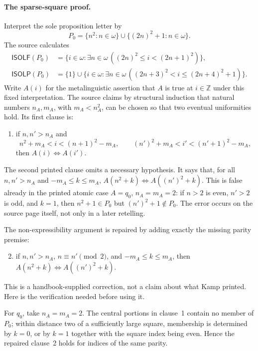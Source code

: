 \paragraph{The sparse-square proof.}
Interpret the sole proposition letter by
\[
 P_0
 =
 \{n^2:n\in\omega\}
 \cup
 \{(2n)^2+1:n\in\omega\}.
\]
The source calculates
\[
\begin{aligned}
 \mathsf{ISOLF}(P_0)
 &=
 \{i\in\omega:
   \exists n\in\omega\,((2n)^2\le i<(2n+1)^2)\},\\
 \mathsf{ISOLP}(P_0)
 &=
 \{1\}\cup
 \{i\in\omega:
   \exists n\in\omega\,((2n+3)^2<i\le(2n+4)^2+1)\}.
\end{aligned}
\]
Write \(A(i)\) for the metalinguistic assertion that \(A\) is true at
\(i\in\mathbb Z\) under this fixed interpretation.  The source claims by
structural induction that natural numbers \(n_A,m_A\), with
\(m_A<n_A^2\), can be chosen so that two eventual uniformities hold.  Its
first clause is:

\begin{enumerate}
\item if \(n,n'>n_A\) and
      \[
       n^2+m_A<i<(n+1)^2-m_A,
       \qquad
       (n')^2+m_A<i'<(n'+1)^2-m_A,
      \]
      then \(A(i)\Longleftrightarrow A(i')\).
\end{enumerate}

The second printed clause omits a necessary hypothesis.  It says that, for
all \(n,n'>n_A\) and \(-m_A\le k\le m_A\),
\(A(n^2+k)\Longleftrightarrow A((n')^2+k)\).  This is false already in the
printed atomic case \(A=q_0\), \(n_A=m_A=2\): if \(n>2\) is even,
\(n'>2\) is odd, and \(k=1\), then \(n^2+1\in P_0\) but
\((n')^2+1\notin P_0\).  The error occurs on the source page itself, not only
in a later retelling.

The non-expressibility argument is repaired by adding exactly the missing
parity premise:
\begin{enumerate}
\setcounter{enumi}{1}
\item if \(n,n'>n_A\), \(n\equiv n'\pmod 2\), and
      \(-m_A\le k\le m_A\), then
      \(A(n^2+k)\Longleftrightarrow A((n')^2+k)\).
\end{enumerate}
This is a handbook-supplied correction, not a claim about what Kamp printed.
Here is the verification needed before using it.

For \(q_0\), take \(n_A=m_A=2\).  The central portions in clause~1 contain
no member of \(P_0\); within distance two of a sufficiently large square,
membership is determined by \(k=0\), or by \(k=1\) together with the square
index being even.  Hence the repaired clause~2 holds for indices of the same
parity.


